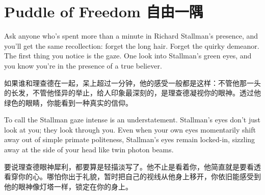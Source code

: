 \chapter{\ifdefined\eng
Puddle of Freedom
\fi
\ifdefined\chs
自由一隅
\fi}
\ifdefined{}
\fi

\ifdefined{}
\fi

\ifdefined\eng
Ask anyone who's spent more than a minute in Richard Stallman's presence, and you'll get the same recollection: forget the long hair. Forget the quirky demeanor. The first thing you notice is the gaze. One look into Stallman's green eyes, and you know you're in the presence of a true believer.
\fi

\ifdefined\chs
如果谁和理查德在一起，呆上超过一分钟，他的感受一般都是这样：不管他那一头的长发，不管他怪异的举止，给人印象最深刻的，是理查德凝视你的眼神。透过他绿色的眼睛，你能看到一种真实的信仰。
\fi

\ifdefined\eng
To call the Stallman gaze intense is an understatement. Stallman's eyes don't just look at you; they look through you. Even when your own eyes momentarily shift away out of simple primate politeness, Stallman's eyes remain locked-in, sizzling away at the side of your head like twin photon beams.
\fi

\ifdefined\chs
要说理查德眼神犀利，都要算是轻描淡写了。他不止是看着你，他简直就是要看透看穿你的心。哪怕你出于礼貌，暂时把自己的视线从他身上移开，你依旧能感受到他的眼神像灯塔一样，锁定在你的身上。
\fi

